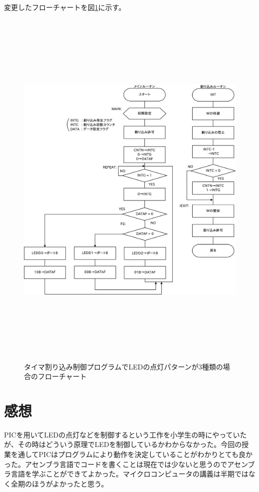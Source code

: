 \documentclass[a4paper,12pt]{ujarticle}
\begin{document}
変更したフローチャートを図\ref{fig:flow_5-14-1}に示す。
  \begin{figure}[htbp]
    \begin{center}
     \includegraphics[height=180mm]{Diagram5-14-1.eps}
    \end{center}
   \caption{タイマ割り込み制御プログラムでLEDの点灯パターンが3種類の場合のフローチャート}
   \label{fig:flow_5-14-1}
  \end{figure}
 \section{感想}
 PICを用いてLEDの点灯などを制御するという工作を小学生の時にやっていたが、その時はどういう原理でLEDを制御しているかわからなかった。今回の授業を通してPICはプログラムにより動作を決定していることがわかりとても良かった。アセンブラ言語でコードを書くことは現在では少ないと思うのでアセンブラ言語を学ぶことができてよかった。マイクロコンピュータの講義は半期ではなく全期のほうがよかったと思う。
\end{document}
